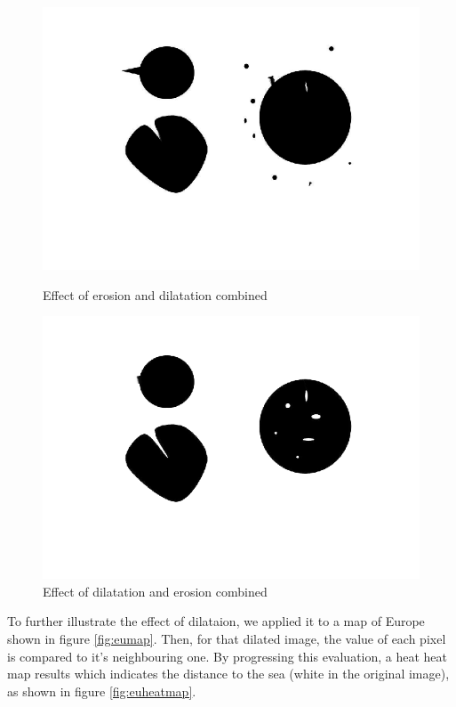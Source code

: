 \begin{figure}[H]
	\centering
	\begin{minipage}[t]{0.4\textwidth}
		\includegraphics[width=\textwidth]{images/images1erodeddilated.png}
		\caption{Effect of erosion and dilatation combined}
		\label{fig:images1erodeddilated}
	\end{minipage}
	\begin{minipage}[t]{0.4\textwidth}
		\includegraphics[width=\textwidth]{images/images1dilatederoded.png}
		\caption{Effect of dilatation and erosion combined}
		\label{fig:images1dilatederoded}
	\end{minipage}
\end{figure}


To further illustrate the effect of dilataion, we applied it to a map of Europe shown in figure \ref{fig:eumap}. Then, for that dilated image, the value of each pixel is compared to it's neighbouring one. By progressing this evaluation, a heat heat map results which indicates the distance to the sea (white in the original image), as shown in figure \ref{fig:euheatmap}.

